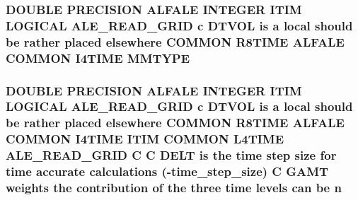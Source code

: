 \hypertarget{msa20_2home_2abonfi_2_c_f_d__codes_2_eul_f_s_83_82_83_2include_2time_8com_a8ef2ef40e44d2eb096b5c209f6d0b1bc}{
\subsubsection[{M\-M\-T\-Y\-P\-E}]{\setlength{\rightskip}{0pt plus 5cm}D\-O\-U\-B\-L\-E P\-R\-E\-C\-I\-S\-I\-O\-N {\bf A\-L\-F\-A\-L\-E} I\-N\-T\-E\-G\-E\-R {\bf I\-T\-I\-M} L\-O\-G\-I\-C\-A\-L {\bf A\-L\-E\-\_\-\-R\-E\-A\-D\-\_\-\-G\-R\-I\-D} c {\bf D\-T\-V\-O\-L} is a local should be rather placed elsewhere C\-O\-M\-M\-O\-N R8\-T\-I\-M\-E {\bf A\-L\-F\-A\-L\-E} C\-O\-M\-M\-O\-N I4\-T\-I\-M\-E M\-M\-T\-Y\-P\-E}}\label{msa20_2home_2abonfi_2_c_f_d__codes_2_eul_f_s_83_82_83_2include_2time_8com_a8ef2ef40e44d2eb096b5c209f6d0b1bc}
\hypertarget{msa20_2home_2abonfi_2_c_f_d__codes_2_eul_f_s_83_82_83_2include_2time_8com_ae2924ded6f091682ae95d5e9c68e516c}{
\subsubsection[{n}]{\setlength{\rightskip}{0pt plus 5cm}D\-O\-U\-B\-L\-E P\-R\-E\-C\-I\-S\-I\-O\-N {\bf A\-L\-F\-A\-L\-E} I\-N\-T\-E\-G\-E\-R {\bf I\-T\-I\-M} L\-O\-G\-I\-C\-A\-L {\bf A\-L\-E\-\_\-\-R\-E\-A\-D\-\_\-\-G\-R\-I\-D} c {\bf D\-T\-V\-O\-L} is a local should be rather placed elsewhere C\-O\-M\-M\-O\-N R8\-T\-I\-M\-E {\bf A\-L\-F\-A\-L\-E} C\-O\-M\-M\-O\-N I4\-T\-I\-M\-E {\bf I\-T\-I\-M} C\-O\-M\-M\-O\-N L4\-T\-I\-M\-E {\bf A\-L\-E\-\_\-\-R\-E\-A\-D\-\_\-\-G\-R\-I\-D} C C {\bf D\-E\-L\-T} is the time {\bf step} size for time accurate calculations (-\/time\-\_\-step\-\_\-size) C {\bf G\-A\-M\-T} weights the contribution of the three time levels can be n}}\label{msa20_2home_2abonfi_2_c_f_d__codes_2_eul_f_s_83_82_83_2include_2time_8com_ae2924ded6f091682ae95d5e9c68e516c}
